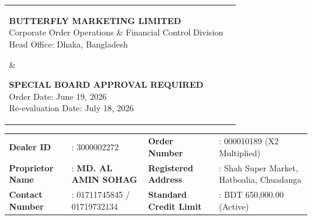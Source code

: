 \documentclass[9pt, a4paper]{article}
\begin{document}
\noindent
\begin{tabularx}{\textwidth}{@{}X r@{}}
    \parbox[b]{11cm}{
        {\fontsize{18}{22}\selectfont \textbf{\textcolor{corporateblue}{BUTTERFLY MARKETING LIMITED}}} \\
        \fontsize{8}{10}\selectfont Corporate Order Operations \& Financial Control Division \\
        \fontsize{8}{10}\selectfont Head Office: Dhaka, Bangladesh
    } & 
    \parbox[b]{5.5cm}{\raggedleft
        \textcolor{alertred}{\textbf{SPECIAL BOARD APPROVAL REQUIRED}} \\
        \fontsize{8}{10}\selectfont Order Date: June 19, 2026 \\
        \fontsize{8}{10}\selectfont Re-evaluation Date: July 18, 2026
    }
\end{tabularx}

\vspace{5mm}

\noindent
\begin{tcolorbox}[colback=lightgray, colframe=bordergray, boxrule=0.5pt, arc=3pt, top=2.5mm, bottom=2.5mm, left=2.5mm, right=2.5mm]
    \fontsize{9}{11}\selectfont
    \begin{tabularx}{\textwidth}{@{}l X l X@{}}
        \textbf{Dealer ID} & : 3000002272 & \textbf{Order Number} & : 000010189 (X2 Multiplied) \\
        \textbf{Proprietor Name} & : \textbf{MD. AL AMIN SOHAG} & \textbf{Registered Address} & : Shah Super Market, Hatboalia, Chuadanga \\
        \textbf{Contact Number} & : 01711745845 / 01719732134 & \textbf{Standard Credit Limit} & : BDT 650,000.00 (Active) \\
    \end{tabularx}
\end{tcolorbox}

\vspace{3mm}

\noindent
\end{document}
